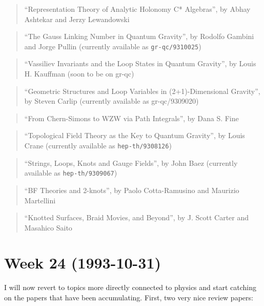 \documentclass{article}
\begin{document}
\begin{quote}
``Representation Theory of Analytic Holonomy C* Algebras'', by Abhay
Ashtekar and Jerzy Lewandowski
\end{quote}

\begin{quote}
``The Gauss Linking Number in Quantum Gravity'', by Rodolfo Gambini and
Jorge Pullin (currently available as \texttt{gr-qc/9310025})
\end{quote}

\begin{quote}
``Vassiliev Invariants and the Loop States in Quantum Gravity'', by
Louis H. Kauffman (soon to be on gr-qc)
\end{quote}

\begin{quote}
``Geometric Structures and Loop Variables in (2+1)-Dimensional
Gravity'', by Steven Carlip (currently available as gr-qc/9309020)
\end{quote}

\begin{quote}
``From Chern-Simons to WZW via Path Integrals'', by Dana S. Fine
\end{quote}

\begin{quote}
``Topological Field Theory as the Key to Quantum Gravity'', by Louis
Crane (currently available as \texttt{hep-th/9308126})
\end{quote}

\begin{quote}
``Strings, Loops, Knots and Gauge Fields'', by John Baez (currently
available as \texttt{hep-th/9309067})
\end{quote}

\begin{quote}
``BF Theories and 2-knots'', by Paolo Cotta-Ramusino and Maurizio
Martellini
\end{quote}

\begin{quote}
``Knotted Surfaces, Braid Movies, and Beyond'', by J. Scott Carter and
Masahico Saito
\end{quote}
\hypertarget{week-24-1993-10-31}{%
\section{Week 24 (1993-10-31)}\label{week-24-1993-10-31}}

I will now revert to topics more directly connected to physics and start
catching on the papers that have been accumulating. First, two very nice
review papers:
\end{document}

